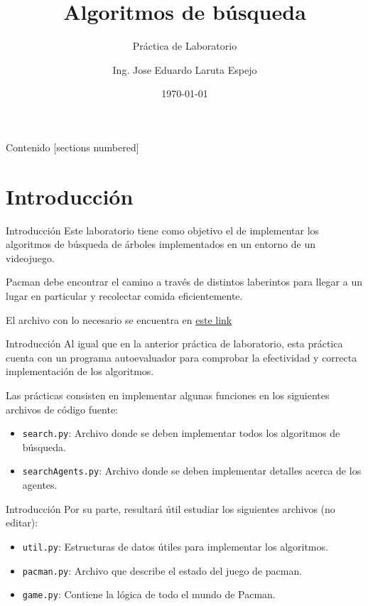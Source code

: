 \documentclass[10pt]{beamer}
\title{Algoritmos de búsqueda}
\subtitle{Práctica de Laboratorio}
\date{\today}
\author{Ing. Jose Eduardo Laruta Espejo}
\institute{Universidad La Salle}
\begin{document}
\maketitle

\begin{frame}[allowframebreaks]{Contenido}
  [sections numbered]
  \tableofcontents[]
\end{frame}


\section{Introducción}
\begin{frame}[fragile]{Introducción}
Este laboratorio tiene como objetivo el de implementar los algoritmos de búsqueda de árboles 
implementados en un entorno de un videojuego.

Pacman debe encontrar el camino a través de distintos laberintos para llegar a un lugar en 
particular y recolectar comida eficientemente.

El archivo con lo necesario se encuentra en \href{https://github.com/tabris2015/ISI-437/raw/master/archivos/search.zip}{este link}
\end{frame}

\begin{frame}{Introducción}
Al igual que en la anterior práctica de laboratorio, esta práctica cuenta con un programa autoevaluador
para comprobar la efectividad y correcta implementación de los algoritmos.

Las prácticas consisten en implementar algunas funciones en los siguientes archivos de código fuente:
\begin{itemize}
    \item \texttt{search.py}: Archivo donde se deben implementar todos los algoritmos de búsqueda.
    \item \texttt{searchAgents.py}: Archivo donde se deben implementar detalles acerca de los agentes.
\end{itemize}
\end{frame}


\begin{frame}{Introducción}
Por su parte, resultará útil estudiar los siguientes archivos (no editar):
\begin{itemize}
    \item \texttt{util.py}: Estructuras de datos útiles para implementar los algoritmos.
    \item \texttt{pacman.py}: Archivo que describe el estado del juego de pacman.
    \item \texttt{game.py}: Contiene la lógica de todo el mundo de Pacman.
\end{itemize}
\end{frame}
\end{document}
